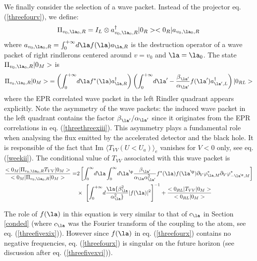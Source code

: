 We finally consider the selection of a wave packet. Instead of the
projector eq. (\ref{threefourv}), we define:
\begin{equation} \Pi_{v_0,\la_0,R} = I_L \otimes a^\dagger_{v_0,\la_0,R}
\ket{0_R
} \bra{0_R} a_{v_0,\la_0,R} \end{equation} where
$a_{v_0,\la_0,R} = \int_0^{+\infty}\! d\la f(\la) a_{\la,R}$ is the
destruction operator of a wave packet of right rindlerons centered around
$v=v_0$ and $\la=\la_0$. The state $\Pi_{v_0,\la_0,R} \ket{0_M} $ is
 \begin{equation} \Pi_{v_0,\la_0,R} \ket{0_M}
= \left( \int_0^{+\infty}\! d\la f^*(\la) a^\dagger_{\la,R} \right)
\left( \int_0^{+\infty}\! d\la^\prime -
{\be_{\la^\prime} \over \al_{\la^\prime}}
f(\la^\prime) a^\dagger_{\la^\prime,L} \right)  \ket{0_{RL}}
\label{123}
\end{equation} where the EPR correlated wave packet in the left Rindler
quadrant appears explicitly.
Note the asymmetry of the wave packets: the
induced
wave packet
in the
left quadrant contains the factor $\be_{\la^\prime} / \al_{\la^\prime}$
since it originates
from
 the EPR correlations in eq. (\ref{threethreexiii}). This asymmetry plays
a fundamental role when analysing the flux emitted by the accelerated
detector and the black hole. It is responsible of the fact that
Im $ \langle T_{VV}(U<U_a) \rangle _e$ vanishes for $V<0$ only, see  eq.
(\ref{weekii}). The conditional value of $T_{VV}$ associated with this wave
packet is
\begin{eqnarray} {
\expect{0_M}{ \Pi_{v_0,\la_0,R} T_{VV} }{0_M}
\over
\expect{0_M} { \Pi_{v_0,\la_0,R} } {0_M}
}  = &
2 \left[
 \int_0^{\infty}\! d\la \int_0^{\infty}\! d\la^{\p}
{\be_{\la^\prime} \over \al_\la \al_{\la^{\prime}}^2 }
f^*(\la) f(\la^{\p}) \partial_V
\varphi_{\la,M}^* \partial_V \varphi_{-\la^{\p},M}^* \right]
 \nonumber\\ &
\times\ \left[  \int_0^{+\infty}\! d\la
{ \be_\la^2  \over \al_\la^2} \vert f(\la) \vert^2
 \right] ^{-1}
+ {
\expect{0_{RL}} {  T_{VV} }{0_M} \over \scal{0_{RL}}{0_M} }
\label{threefourx}
\end{eqnarray}

The role of $f(\la)$
in this equation is very similar to that of $c_\la$ in
Section \ref{conded} (where
$c_\la$ was the Fourier transform of the coupling to the atom, see eq.
(\ref{threefivexix})). However since $f(\la)$ in eq. (\ref{threefourx})
contains no negative frequencies, eq. (\ref{threefourx}) is singular on the
future horizon (see discussion after eq. (\ref{threefivexvi})).





